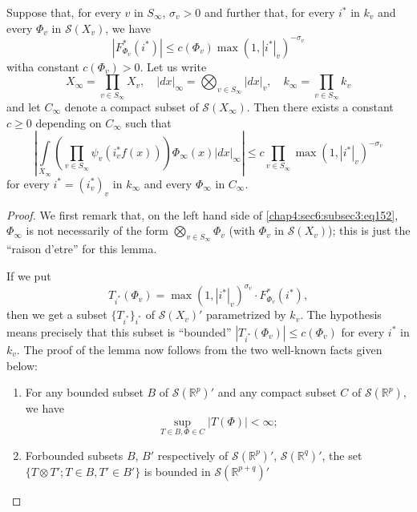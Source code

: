 \begin{lemma}\label{chap4:sec6:subsec3:lem7} %
Suppose that, for every $v$ in $S_{\infty}$, $\sigma_{v}>0$ and
further that, for every $i^{\ast}$ in $k_{v}$ and every $\Phi_{v}$ in
$\mathscr{S}(X_{v})$, we have
$$
|F^{\ast}_{\Phi_{v}}(i^{\ast})|\leq c(\Phi_{v})\max
(1,|i^{\ast}|_{v})^{-\sigma_{v}}
$$
with\pageoriginale a constant $c(\Phi_{v})>0$. Let us write
$$
X_{\infty}=\prod_{v\in S_{\infty}}X_{v},\quad
|dx|_{\infty}=\bigotimes_{v\in S_{\infty}}|dx|_{v},\quad
k_{\infty}=\prod_{v\in S_{\infty}}k_{v}
$$
and let $C_{\infty}$ denote a compact subset of
$\mathscr{S}(X_{\infty})$. Then there exists a constant $c\geq 0$
depending on $C_{\infty}$ such that
\begin{equation*}
  \left|\int\limits_{X_{\infty}}\left(\prod_{v\in
    S_{\infty}}\psi_{v}(i^{\ast}_{v}f(x))\right)\Phi_{\infty}(x)
  |dx|_{\infty}\right|\leq c\prod_{v\in
    S_{\infty}}\max(1,|i^{\ast}|_{v})^{-\sigma_{v}}
  \tag{152}\label{chap4:sec6:subsec3:eq152} 
\end{equation*}
for every $i^{\ast}=(i^{\ast}_{v})_{v}$ in $k_{\infty}$ and every
$\Phi_{\infty}$ in $C_{\infty}$.
\end{lemma}

\begin{proof}
We first remark that, on the left hand side
of \ref{chap4:sec6:subsec3:eq152}, 
$\Phi_{\infty}$ is not necessarily of the form
$\bigotimes\limits_{v\in S_{\infty}}\Phi_{v}$ (with $\Phi_{v}$ in
$\mathscr{S}(X_{v})$); this is just the ``raison d'etre'' for this lemma.

If we put
$$
T_{i^{\ast}}(\Phi_{v})=\max(1,|i^{\ast}|_{v})^{\sigma_{v}}\cdot
F^{\ast}_{\Phi_{v}}(i^{\ast}), 
$$
then we get a subset $\{T_{i^{\ast}}\}_{i^{\ast}}$ of
$\mathscr{S}(X_{v})'$ parametrized by $k_{v}$. The hypothesis means
precisely that this subset is ``bounded'' \ie
$|T_{i^{\ast}}(\Phi_{v})|\leq c(\Phi_{v})$ for every $i^{\ast}$ in
$k_{v}$. The proof of the lemma now follows from the two well-known
facts given below:
\begin{enumerate}
\renewcommand{\theenumi}{\roman{enumi}}
\renewcommand{\labelenumi}{(\theenumi)}
\item For any bounded subset $B$ of $\mathscr{S}(\mathbb{R}^{p})'$ and any
  compact subset $C$ of $\mathscr{S}(\mathbb{R}^{p})$, we have
  $$
  \sup\limits_{T\in B,\Phi\in C}|T(\Phi)|<\infty;
  $$
\item For\pageoriginale bounded subsets $B$, $B'$ respectively of
  $\mathscr{S}(\mathbb{R}^{p})'$, $\mathscr{S}(\mathbb{R}^{q})'$, the set
  $\{T\otimes T';T\in B,T'\in B'\}$ is bounded in
  $\mathscr{S}(\mathbb{R}^{p+q})'$ 
\end{enumerate}
\end{proof}


